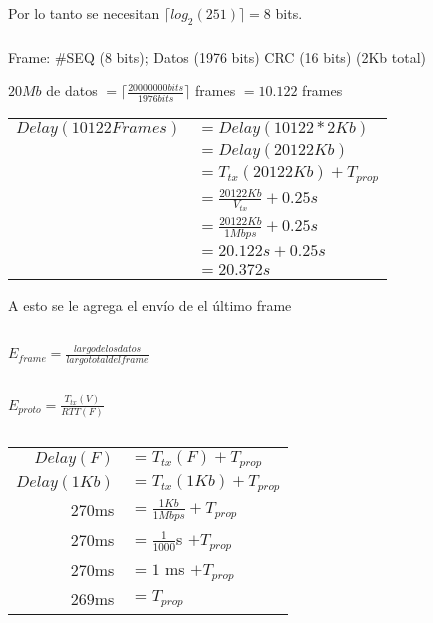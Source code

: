 Por lo tanto se necesitan $\lceil log_2(251) \rceil = 8$ bits.

\subsubsection{}
Frame: \#SEQ (8 bits); Datos (1976 bits) CRC (16 bits) (2Kb total)

$20Mb$ de datos $= \lceil \frac{20000000bits}{1976bits} \rceil$ frames $= 10.122$ frames

\begin{tabular}{rl}
$Delay(10122 Frames)$ & $= Delay(10122 * 2Kb)$ \\
& $= Delay(20122Kb)$ \\
& $= T_{tx}(20122Kb) + T_{prop}$ \\
& $= \frac{20122Kb}{V_{tx}} + 0.25s$ \\
& $= \frac{20122Kb}{1Mbps} + 0.25s$ \\
& $= 20.122s + 0.25s$ \\
& $= 20.372s$ \\
\end{tabular}

A esto se le agrega el envío de el último frame

\subsection{}

\subsubsection{}
$E_{frame} = \frac{largo de los datos}{largo total del frame} $

\subsection{}
$E_{proto} = \frac{T_{tx}(V)}{RTT(F)}$

\subsection{}
\subsubsection{}
\begin{tabular}{rl}
$Delay(F) $ & $= T_{tx}(F) + T_{prop}$ \\
$Delay(1Kb) $ & $= T_{tx}(1Kb) + T_{prop}$ \\
$270$ms & $= \frac{1Kb}{1Mbps} + T_{prop}$ \\
$270$ms & $= \frac{1}{1000}$s $+ T_{prop}$ \\
$270$ms & $= 1$ ms $+ T_{prop}$ \\
$269$ms & $= T_{prop}$ \\
\end{tabular}

